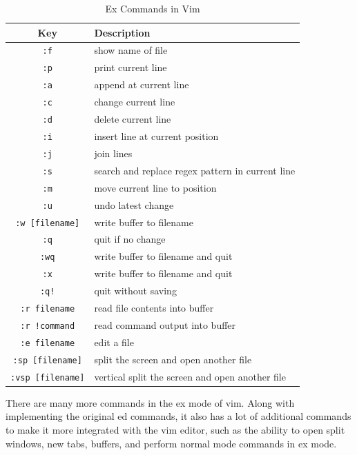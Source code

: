 \begin{table}[h!]
  \caption{Ex Commands in Vim}
  \begin{tabular}{c l}
    \toprule
    Key & Description \\
    \midrule
    \lstinline|:f| & show name of file \\
    \lstinline|:p| & print current line \\
    \lstinline|:a| & append at current line \\
    \lstinline|:c| & change current line \\
    \lstinline|:d| & delete current line \\
    \lstinline|:i| & insert line at current position \\
    \lstinline|:j| & join lines \\
    \lstinline|:s| & search and replace regex pattern in current line \\
    \lstinline|:m| & move current line to position \\
    \lstinline|:u| & undo latest change \\
    \lstinline|:w [filename]| & write buffer to filename \\
    \lstinline|:q| & quit if no change \\
    \lstinline|:wq| & write buffer to filename and quit \\
    \lstinline|:x| & write buffer to filename and quit \\
    \lstinline|:q!| & quit without saving \\
    \lstinline|:r filename| & read file contents into buffer \\
    \lstinline|:r !command| & read command output into buffer \\
    \lstinline|:e filename| & edit a file \\
    \lstinline|:sp [filename]| & split the screen and open another file \\
    \lstinline|:vsp [filename]| & vertical split the screen and open another file \\
    \bottomrule
  \end{tabular}
\end{table}

There are many more commands in the ex mode of vim.
Along with implementing the original ed commands, it
also has a lot of additional commands to make it more
integrated with the vim editor, such as the ability
to open split windows, new tabs, buffers, and perform
normal mode commands in ex mode.

